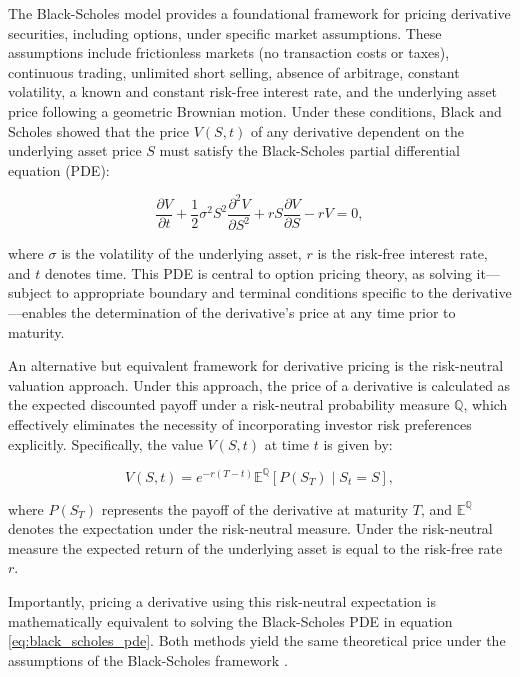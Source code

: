 The Black-Scholes model provides a foundational framework for pricing derivative securities, 
including options, under specific market assumptions. These assumptions include frictionless markets 
(no transaction costs or taxes), continuous trading, unlimited short selling, absence of arbitrage, constant volatility, a known
 and constant risk-free interest rate, and the underlying asset price following a geometric Brownian motion. 
 Under these conditions, Black and Scholes \cite{black1973pricing} showed that the price $V(S, t)$ of any derivative 
 dependent on the underlying asset price $S$ must satisfy the Black-Scholes partial differential equation (PDE):

\begin{equation}\label{eq:black_scholes_pde}
\frac{\partial V}{\partial t} + \frac{1}{2}\sigma^2 S^2 \frac{\partial^2 V}{\partial S^2} + rS\frac{\partial V}{\partial S} - rV = 0,
\end{equation}

where $\sigma$ is the volatility of the underlying asset, $r$ is the risk-free interest rate, and 
$t$ denotes time. This PDE is central to option pricing theory, as solving it—subject to appropriate boundary and
terminal conditions specific to the derivative—enables the determination of the derivative's price at any time prior to maturity.

An alternative but equivalent framework for derivative pricing is the risk-neutral valuation approach. Under this approach, 
the price of a derivative is calculated as the expected discounted payoff under a risk-neutral probability measure 
$\mathbb{Q}$, which effectively eliminates the necessity of incorporating investor risk preferences explicitly. 
Specifically, the value $V(S,t)$ at time $t$ is given by:

\begin{equation}\label{eq:risk_neutral_valuation}
    V(S,t) = e^{-r(T - t)} \mathbb{E}^{\mathbb{Q}}[P(S_T) \mid S_t = S],
\end{equation}

where $P(S_T)$ represents the payoff of the derivative at maturity $T$, and $\mathbb{E}^{\mathbb{Q}}$ denotes the
expectation under the risk-neutral measure. Under the risk-neutral measure the expected return of the
underlying asset is equal to the risk-free rate $r$.

Importantly, pricing a derivative using this risk-neutral expectation is mathematically equivalent to solving the Black-Scholes 
PDE in equation \eqref{eq:black_scholes_pde}. Both methods yield the same theoretical price under the assumptions of the 
Black-Scholes framework \cite{hull2016options}.

